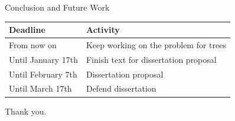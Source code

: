 \documentclass[10pt,aspectratio=169,english]{beamer}
\begin{document}
\begin{frame}{Conclusion and Future Work}
	\begin{center}
		\begin{tabular}{| l | l |}
			\hline
			\textbf{Deadline} & \textbf{Activity} \\
			\hline
			From now on & Keep working on the problem for trees \\
			Until January 17th & Finish text for dissertation proposal \\
			Until February 7th & Dissertation proposal \\
			Until March 17th & Defend dissertation \\
			\hline
		\end{tabular}
	\end{center}
\end{frame}

\begin{frame}{}
	Thank you.
\end{frame}

\end{document}
